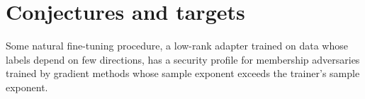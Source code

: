 \chapter{Conjectures and targets}\label{ch:conjectures}

\begin{conjecture}
Some natural fine-tuning procedure, a low-rank adapter trained on data whose labels
depend on few directions, has a security profile for membership adversaries trained
by gradient methods whose sample exponent exceeds the trainer's sample exponent.
\end{conjecture}
